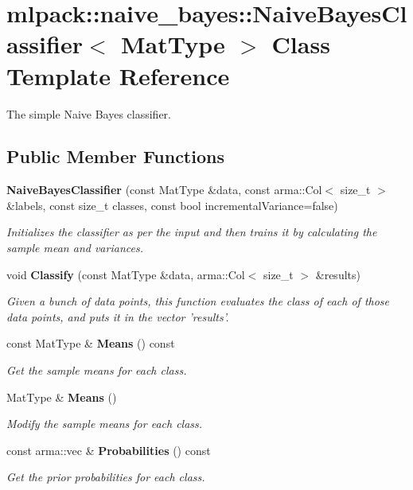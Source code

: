 \section{mlpack\-:\-:naive\-\_\-bayes\-:\-:Naive\-Bayes\-Classifier$<$ Mat\-Type $>$ Class Template Reference}
\label{classmlpack_1_1naive__bayes_1_1NaiveBayesClassifier}


The simple Naive Bayes classifier.  


\subsection*{Public Member Functions}
\begin{DoxyCompactItemize}
\item 
{\bf Naive\-Bayes\-Classifier} (const Mat\-Type \&data, const arma\-::\-Col$<$ size\-\_\-t $>$ \&labels, const size\-\_\-t classes, const bool incremental\-Variance=false)
\begin{DoxyCompactList}\small\item\em Initializes the classifier as per the input and then trains it by calculating the sample mean and variances. \end{DoxyCompactList}\item 
void {\bf Classify} (const Mat\-Type \&data, arma\-::\-Col$<$ size\-\_\-t $>$ \&results)
\begin{DoxyCompactList}\small\item\em Given a bunch of data points, this function evaluates the class of each of those data points, and puts it in the vector 'results'. \end{DoxyCompactList}\item 
const Mat\-Type \& {\bf Means} () const 
\begin{DoxyCompactList}\small\item\em Get the sample means for each class. \end{DoxyCompactList}\item 
Mat\-Type \& {\bf Means} ()
\begin{DoxyCompactList}\small\item\em Modify the sample means for each class. \end{DoxyCompactList}\item 
const arma\-::vec \& {\bf Probabilities} () const 
\begin{DoxyCompactList}\small\item\em Get the prior probabilities for each class. \end{DoxyCompactList}\item 

\end{DoxyCompactItemize}
